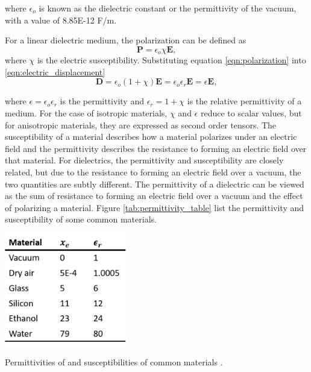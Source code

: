  \noindent where $\epsilon_o$ is known as the dielectric constant or the permittivity of the vacuum, with a value of 8.85E-12 F/m.
 
 \par For a linear dielectric medium, the polarization can be defined as 
 \begin{equation}
     \boldsymbol{P} = \epsilon_o\chi\boldsymbol{E},
     \label{eqn:polarization}
 \end{equation}
 \noindent where $\chi$ is the electric susceptibility. Substituting equation \ref{eqn:polarization} into \ref{eqn:electric_displacement}
 \begin{equation}
    \boldsymbol{D} = \epsilon_o(1+\chi)\boldsymbol{E} = \epsilon_o \epsilon_r \boldsymbol{E}=\epsilon\boldsymbol{E},
 \end{equation}
 
 \noindent where $\epsilon = \epsilon_o\epsilon_r$ is the permittivity and $\epsilon_r = 1 + \chi$ is the relative permittivity of a medium. For the case of isotropic materials, $\chi$ and $\epsilon$ reduce to scalar values, but for anisotropic materials, they are expressed as second order tensors. The susceptibility of a material describes how a material polarizes under an electric field and the permittivity describes the resistance to forming an electric field over that material. For dielectrics, the permittivity and susceptibility are closely related, but due to the resistance to forming an electric field over a vacuum, the two quantities are subtly different. The permittivity of a dielectric can be viewed as the sum of resistance to forming an electric field over a vacuum and the effect of polarizing a material.  Figure \ref{tab:permittivity_table} list the permittivity and susceptibility of some common materials.
 
 \begin{table}[h]
     \centering
     \includegraphics[width=0.4\textwidth]{images/permittivityTable.png}
     \caption[Permittivities of and susceptibilities of common materials]{Permittivities of and susceptibilities of common materials \cite{kirby_micro-and_2010}.}
     \label{tab:permittivity_table}
 \end{table}

